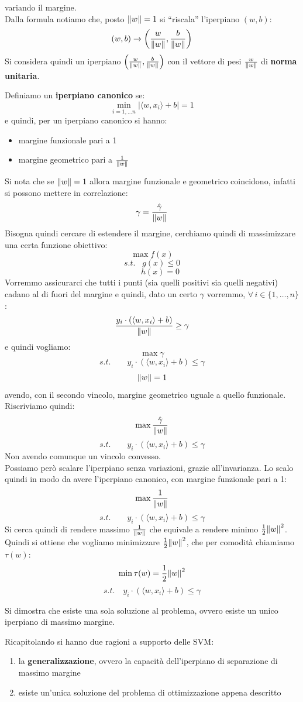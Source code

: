 \documentclass[a4paper,12pt, oneside]{book}
\begin{document}
variando il margine.\\
Dalla formula notiamo che, posto $\norm{w}=1$ si ``riscala'' l'iperpiano $(w,b)$:
\[(w,b)\to\left(\frac{w}{\norm{w}},\frac{b}{\norm{w}}\right)\]
Si considera quindi un iperpiano
$\left(\frac{w}{\norm{w}},\frac{b}{\norm{w}}\right)$ con il vettore di pesi
$\frac{w}{\norm{w}}$ di \textbf{norma unitaria}.
\begin{definizione}
  Definiamo un \textbf{iperpiano canonico} se:
  \[\min_{i=1,\ldots n}|\langle w,x_i\rangle+b|=1\]
  e quindi, per un iperpiano canonico si hanno:
  \begin{itemize}
    \item margine funzionale pari a 1
    \item margine geometrico pari a $\frac{1}{\norm{w}}$
  \end{itemize}
\end{definizione}
Si nota che se $\norm{w}=1$ allora margine funzionale e geometrico coincidono,
infatti si possono mettere in correlazione:
\[\gamma=\frac{\hat{\gamma}}{\norm{w}}\]
Bisogna quindi cercare di estendere il margine, cerchiamo quindi di
massimizzare una certa funzione obiettivo:
\[\max f(x)\]
\[s.t.\,\,\,\,\,g(x)\leq 0\]
\[\qquad h(x)=0\]
Vorremmo assicurarci che tutti i punti (sia quelli positivi sia quelli negativi)
cadano  al di fuori del margine e quindi, dato un certo $\gamma$ vorremmo,
$\forall\,i\in\{1,\ldots,n\}$:
\[\frac{y_i\cdot(\langle w,x_i\rangle+b)}{\norm{w}}\geq \gamma\]
e quindi vogliamo:
\[\max \gamma\]
\[s.t.\qquad y_i\cdot(\langle w,x_i\rangle+b)\leq \gamma\]
\[\norm{w}=1 \]
avendo, con il secondo vincolo,  margine geometrico uguale a quello
funzionale.\\
Riscriviamo quindi:
\[\max \frac{\hat{\gamma}}{\norm{w}}\]
\[s.t.\qquad y_i\cdot(\langle w,x_i\rangle+b)\leq \gamma\]
Non avendo comunque un vincolo convesso.\\
Possiamo però scalare l'iperpiano senza variazioni, grazie all'invarianza. Lo
scalo quindi in modo da avere l'iperpiano canonico, con margine funzionale pari
a 1:
\[\max \frac{1}{\norm{w}}\]
\[s.t.\qquad y_i\cdot(\langle w,x_i\rangle+b)\leq \gamma\]
Si cerca quindi di rendere massimo $\frac{1}{\norm{w}}$ che equivale a rendere
minimo $\frac{1}{2}\norm{w}^2$. Quindi si ottiene che vogliamo minimizzare
$\frac{1}{2}\norm{w}^2$, che per comodità chiamiamo $\tau(w)$:
\[\min \tau(w)=\frac{1}{2}\norm{w}^2\]
\[s.t.\quad y_i\cdot(\langle w,x_i\rangle+b)\leq \gamma\]
\begin{teorema}
  Si dimostra che esiste una sola soluzione al problema, ovvero esiste un unico
  iperpiano di massimo margine.
\end{teorema}
Ricapitolando si hanno due ragioni a supporto delle SVM:
\begin{enumerate}
  \item la \textbf{generalizzazione}, ovvero la capacità dell'iperpiano di
  separazione di massimo margine
  \item esiste un’unica soluzione del problema di ottimizzazione appena
  descritto 
\end{enumerate}
\end{document}
